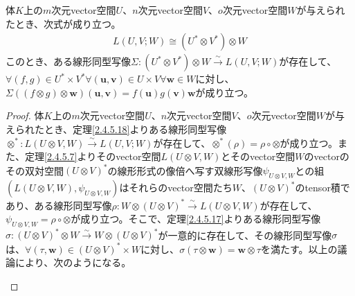 \documentclass[dvipdfmx]{jsarticle}
\begin{document}
\begin{thm}\label{2.4.5.19}
体$K$上の$m$次元vector空間$U$、$n$次元vector空間$V$、$o$次元vector空間$W$が与えられたとき、次式が成り立つ。
\begin{align*}
L(U,V;W) \cong \left( U^{*} \otimes V^{*} \right) \otimes W
\end{align*}
このとき、ある線形同型写像$\varSigma:\left( U^{*} \otimes V^{*} \right) \otimes W\overset{\sim}{\rightarrow}L(U,V;W)$が存在して、$\forall(f,g) \in U^{*} \times V^{*}\forall\left( \mathbf{u},\mathbf{v} \right) \in U \times V\forall\mathbf{w} \in W$に対し、$\varSigma\left( (f \otimes g) \otimes \mathbf{w} \right)\left( \mathbf{u},\mathbf{v} \right) = f\left( \mathbf{u} \right)g\left( \mathbf{v} \right)\mathbf{w}$が成り立つ。
\end{thm}
\begin{proof}
体$K$上の$m$次元vector空間$U$、$n$次元vector空間$V$、$o$次元vector空間$W$が与えられたとき、定理\ref{2.4.5.18}よりある線形同型写像$\otimes^{*}:L(U \otimes V,W)\overset{\sim}{\rightarrow}L(U,V;W)$が存在して、$\otimes^{*}(\rho) = \rho \circ \otimes$が成り立つ。また、定理\ref{2.4.5.7}よりそのvector空間$L(U \otimes V,W)$とそのvector空間$W$のvectorのその双対空間$(U \otimes V)^{*}$の線形形式の像倍へ写す双線形写像$\psi_{U \otimes V,W}$との組$\left( L(U \otimes V,W),\psi_{U \otimes V,W} \right)$はそれらのvector空間たち$W$、$(U \otimes V)^{*}$のtensor積であり、ある線形同型写像$\rho:W \otimes (U \otimes V)^{*}\overset{\sim}{\rightarrow}L(U \otimes V,W)$が存在して、$\psi_{U \otimes V,W} = \rho \circ \otimes$が成り立つ。そこで、定理\ref{2.4.5.17}よりある線形同型写像$\sigma:(U \otimes V)^{*} \otimes W\overset{\sim}{\rightarrow}W \otimes (U \otimes V)^{*}$が一意的に存在して、その線形同型写像$\sigma$は、$\forall\left( \tau,\mathbf{w} \right) \in (U \otimes V)^{*} \times W$に対し、$\sigma\left( \tau \otimes \mathbf{w} \right) = \mathbf{w} \otimes \tau$を満たす。以上の議論により、次のようになる。
\begin{center}
\end{center}
\end{proof}
\end{document}
